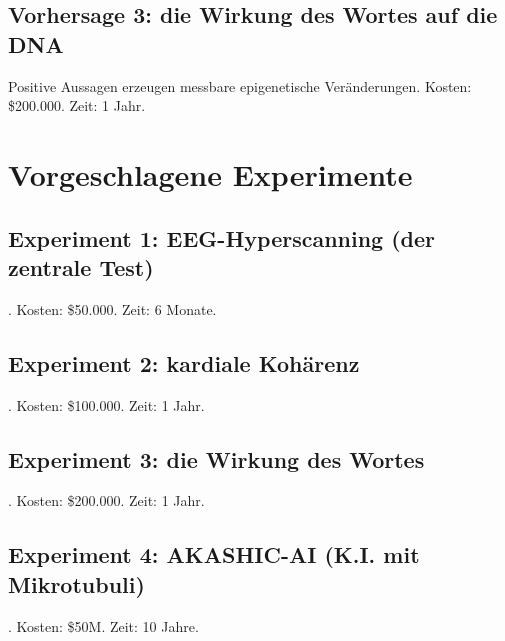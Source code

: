 \subsection{Vorhersage 3: die Wirkung des Wortes auf die DNA}
Positive Aussagen erzeugen messbare epigenetische Veränderungen. Kosten: \$200.000. Zeit: 1 Jahr.

\section{Vorgeschlagene Experimente}
\subsection{Experiment 1: EEG-Hyperscanning (der zentrale Test)}. Kosten: \$50.000. Zeit: 6 Monate.
\subsection{Experiment 2: kardiale Kohärenz}. Kosten: \$100.000. Zeit: 1 Jahr.
\subsection{Experiment 3: die Wirkung des Wortes}. Kosten: \$200.000. Zeit: 1 Jahr.
\subsection{Experiment 4: AKASHIC-AI (K.I. mit Mikrotubuli)}. Kosten: \$50M. Zeit: 10 Jahre.

